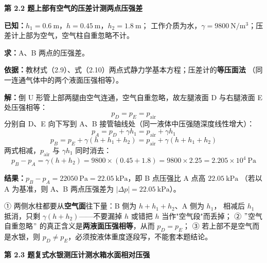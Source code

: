 \noindent\textbf{第 2.2 题\quad 上部有空气的压差计测两点压强差}

\begin{jie}
\textbf{已知：}$h_1=0.6\ \mathrm{m}$，$h=0.45\ \mathrm{m}$，$h_2=1.8\ \mathrm{m}$；
工作介质为水，$\gamma=9800\ \mathrm{N/m^3}$；压差计上部为空气，空气柱自重忽略不计。

\textbf{求：}A、B 两点的压强差。

\textbf{依据：}教材式（2.9）、式（2.10）两点式静力学基本方程；压差计的\textbf{等压面法}
（同一连通气体中的两个液面压强相等）。

\textbf{解：}倒 U 形管上部两腿由空气连通，空气自重忽略，故左腿液面 D 与右腿液面 E 处压强相等：
\[ p_D=p_E=p_{\text{air}} \]
分别自 D、E 向下写到 A、B 接管轴线处（同一液体中压强随深度线性增大）：
\[ p_A=p_D+\gamma h_1=p_{\text{air}}+\gamma h_1 \]
\[ p_B=p_E+\gamma\left(h+h_1+h_2\right)=p_{\text{air}}+\gamma\left(h+h_1+h_2\right) \]
两式相减，$p_{\text{air}}$ 与 $\gamma h_1$ 同时消去：
\[ p_B-p_A=\gamma\left(h+h_2\right)=9800\times(0.45+1.8)=9800\times2.25=2.205\times10^4\ \mathrm{Pa} \]

\textbf{结果：}$p_B-p_A=22050\ \mathrm{Pa}=22.05\ \mathrm{kPa}$，即 B 点压强比 A 点高 $22.05\ \mathrm{kPa}$
（若以 A 为基准，则 A、B 两点压强差为 $|\Delta p|=22.05\ \mathrm{kPa}$）。
\end{jie}

\begin{yicuo}
① 两侧水柱都要从\textbf{空气面}往下量：B 侧为 $h+h_1+h_2$、A 侧为 $h_1$，
相减后 $h_1$ 抵消，只剩 $\gamma(h+h_2)$——不要漏掉 $h$ 或错把 $h$ 当作"空气段"而丢掉；
② $"$空气自重忽略$"$ 的真正含义是\textbf{两液面压强相等}，从而 $p_D=p_E$；
③ 若上部不是空气而是水银，则 $p_D\ne p_E$，必须按液体重度逐段写，不能套本题结论。
\end{yicuo}

\noindent\textbf{第 2.3 题\quad 复式水银测压计测水箱水面相对压强}

